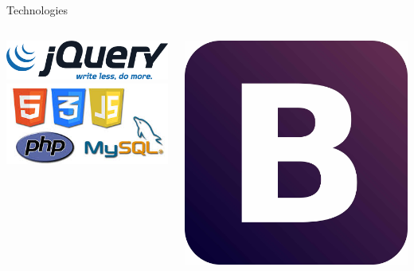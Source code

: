 \documentclass[11pt]{beamer}
\begin{document}
\begin{frame}{Technologies}
\begin{columns}[t]
	\begin{column}[T]{.5\textwidth}
		\begin{center}
		\includegraphics[width=.3\paperwidth]{images/jquery-logo.png}\\
		\vspace{1cm}
		\includegraphics[width=.4\paperwidth]{images/html.jpeg}
		\end{center}
  	\end{column}
  	\begin{column}[T]{.5\textwidth}
  		\begin{center}
  		\includegraphics[width=.25\paperwidth]{images/bootstrap.jpg}
  		\end{center}
	\end{column}
\end{columns}
\begin{center}

\end{center}
\end{frame}
\end{document}
